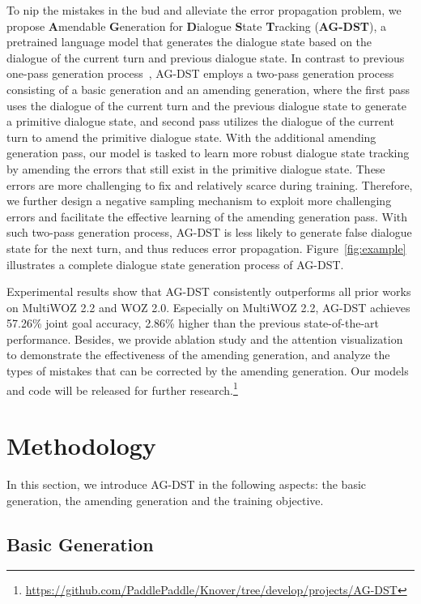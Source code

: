 \documentclass[11pt]{article}
\begin{document}
To nip the mistakes in the bud and alleviate the error propagation problem, we propose \textbf{A}mendable \textbf{G}eneration for \textbf{D}ialogue \textbf{S}tate \textbf{T}racking (\textbf{AG-DST}), a pretrained language model that generates the dialogue state based on the dialogue of the current turn and previous dialogue state. In contrast to previous one-pass generation process~\citep{kim-etal-2020-efficient,zeng2020multi,lin-etal-2020-mintl,yang2021ubar}, AG-DST employs a two-pass generation process consisting of a basic generation and an amending generation, where the first pass uses the dialogue of the current turn and the previous dialogue state to generate a primitive dialogue state, and second pass utilizes the dialogue of the current turn to amend the primitive dialogue state. 
With the additional amending generation pass, our model is tasked to learn more robust dialogue state tracking by amending the errors that still exist in the primitive dialogue state. These errors are more challenging to fix and relatively scarce during training. Therefore, we further design a negative sampling mechanism to exploit more challenging errors and facilitate the effective learning of the amending generation pass. With such two-pass generation process, AG-DST is less likely to generate false dialogue state for the next turn, and thus reduces error propagation.
Figure~\ref{fig:example} illustrates a complete dialogue state generation process of AG-DST. 


Experimental results show that AG-DST consistently outperforms all prior works on MultiWOZ 2.2 and WOZ 2.0. Especially on MultiWOZ 2.2, AG-DST achieves 57.26\% joint goal accuracy, 2.86\% higher than the previous state-of-the-art performance. Besides, we provide ablation study and the attention visualization to demonstrate the effectiveness of the amending generation, and analyze the types of mistakes that can be corrected by the amending generation. Our models and code will be released for further research.\footnote{\url{https://github.com/PaddlePaddle/Knover/tree/develop/projects/AG-DST}}

\section{Methodology}

In this section, we introduce AG-DST in the following aspects: the basic generation, the amending generation and the training objective.

\subsection{Basic Generation}
\end{document}
